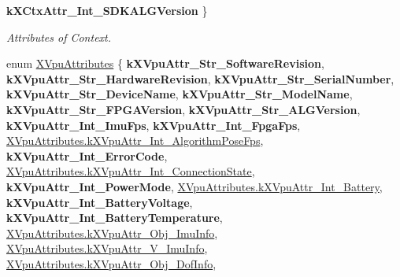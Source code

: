\begin{DoxyCompactItemize}
{\bfseries k\+X\+Ctx\+Attr\+\_\+\+Int\+\_\+\+S\+D\+K\+A\+L\+G\+Version}
 \}
\begin{DoxyCompactList}\small\item\em Attributes of Context. \end{DoxyCompactList}\item 
enum \mbox{\hyperlink{class_ximmerse_1_1_input_system_1_1_x_device_plugin_a93f84daf5ee0da44d8346e78df766f6b}{X\+Vpu\+Attributes}} \{ \newline
{\bfseries k\+X\+Vpu\+Attr\+\_\+\+Str\+\_\+\+Software\+Revision}, 
{\bfseries k\+X\+Vpu\+Attr\+\_\+\+Str\+\_\+\+Hardware\+Revision}, 
{\bfseries k\+X\+Vpu\+Attr\+\_\+\+Str\+\_\+\+Serial\+Number}, 
{\bfseries k\+X\+Vpu\+Attr\+\_\+\+Str\+\_\+\+Device\+Name}, 
\newline
{\bfseries k\+X\+Vpu\+Attr\+\_\+\+Str\+\_\+\+Model\+Name}, 
{\bfseries k\+X\+Vpu\+Attr\+\_\+\+Str\+\_\+\+F\+P\+G\+A\+Version}, 
{\bfseries k\+X\+Vpu\+Attr\+\_\+\+Str\+\_\+\+A\+L\+G\+Version}, 
{\bfseries k\+X\+Vpu\+Attr\+\_\+\+Int\+\_\+\+Imu\+Fps}, 
\newline
{\bfseries k\+X\+Vpu\+Attr\+\_\+\+Int\+\_\+\+Fpga\+Fps}, 
\mbox{\hyperlink{class_ximmerse_1_1_input_system_1_1_x_device_plugin_a93f84daf5ee0da44d8346e78df766f6ba95f754b9f90e95a8a1365de2fb05054b}{X\+Vpu\+Attributes.\+k\+X\+Vpu\+Attr\+\_\+\+Int\+\_\+\+Algorithm\+Pose\+Fps}}, 
{\bfseries k\+X\+Vpu\+Attr\+\_\+\+Int\+\_\+\+Error\+Code}, 
\mbox{\hyperlink{class_ximmerse_1_1_input_system_1_1_x_device_plugin_a93f84daf5ee0da44d8346e78df766f6ba7290722d24362499d5d1828c86dc94ca}{X\+Vpu\+Attributes.\+k\+X\+Vpu\+Attr\+\_\+\+Int\+\_\+\+Connection\+State}}, 
\newline
{\bfseries k\+X\+Vpu\+Attr\+\_\+\+Int\+\_\+\+Power\+Mode}, 
\mbox{\hyperlink{class_ximmerse_1_1_input_system_1_1_x_device_plugin_a93f84daf5ee0da44d8346e78df766f6ba42b3e502c60b86bc1efddceb5b213a8b}{X\+Vpu\+Attributes.\+k\+X\+Vpu\+Attr\+\_\+\+Int\+\_\+\+Battery}}, 
{\bfseries k\+X\+Vpu\+Attr\+\_\+\+Int\+\_\+\+Battery\+Voltage}, 
{\bfseries k\+X\+Vpu\+Attr\+\_\+\+Int\+\_\+\+Battery\+Temperature}, 
\newline
\mbox{\hyperlink{class_ximmerse_1_1_input_system_1_1_x_device_plugin_a93f84daf5ee0da44d8346e78df766f6bae5ebad51f6fd55cffb224515779ed2cc}{X\+Vpu\+Attributes.\+k\+X\+Vpu\+Attr\+\_\+\+Obj\+\_\+\+Imu\+Info}}, 
\mbox{\hyperlink{class_ximmerse_1_1_input_system_1_1_x_device_plugin_a93f84daf5ee0da44d8346e78df766f6ba1d92bcd656b1f529817bf9c0426b4823}{X\+Vpu\+Attributes.\+k\+X\+Vpu\+Attr\+\_\+\+V\+\_\+\+Imu\+Info}}, 
\mbox{\hyperlink{class_ximmerse_1_1_input_system_1_1_x_device_plugin_a93f84daf5ee0da44d8346e78df766f6bae28cacdbd204466c47eab2bacd75f47d}{X\+Vpu\+Attributes.\+k\+X\+Vpu\+Attr\+\_\+\+Obj\+\_\+Dof\+Info}}, 

\end{DoxyCompactItemize}
